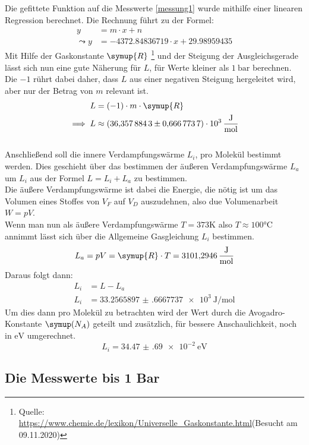 Die gefittete Funktion auf die Messwerte \ref{messung1} wurde mithilfe einer linearen Regression berechnet.
Die Rechnung führt zu der Formel:
\begin{align}
    y&=m\cdot x+n\\
    \leadsto y&=-4372.84836719 \cdot x+29.98959435
\end{align}
Mit Hilfe der Gaskonstante $\symup{R}$   \footnote{Quelle: \url{https://www.chemie.de/lexikon/Universelle_Gaskonstante.html}(Besucht am 09.11.2020)}
und der Steigung der Ausgleichsgerade lässt sich nun eine gute Näherung für $L$, für Werte kleiner als $\SI{1}{\bar}$ berechnen.
Die $-1$ rührt dabei daher, dass $L$ aus einer negativen Steigung hergeleitet wird, aber nur der Betrag von $m$ relevant ist.
\begin{align}
    L&=(-1) \cdot m \cdot \symup{R}\\
    \implies L&\approx\SI{36.3578843(6667737)e3}{\joule\per\mol}
\end{align}\\
Anschließend soll die innere Verdampfungswärme $L_i$, pro Molekül bestimmt werden.
Dies geschieht über das bestimmen der äußeren Verdampfungswärme $L_a$ um $L_i$ aus der Formel $L=L_i+L_a$ zu bestimmen.\\
Die äußere Verdampfungswärme ist dabei die Energie, die nötig ist um das Volumen eines Stoffes von $V_F$ auf $V_D$ auszudehnen,
also due Volumenarbeit $W=pV$.\\
Wenn man nun als äußere Verdampfungswärme $T=373 \si{\kelvin}$ also $T\approx 100 \si{\celsius}$ annimmt lässt sich über die Allgemeine Gasgleichung $L_i$ bestimmen.
\begin{equation}
    L_a=pV=\symup{R} \cdot T = \SI{3101.2946}{\joule\per\mol}
\end{equation}
Daraus folgt dann:
\begin{align}
    L_i&=L-L_a\\
    L_i&=\SI{33.2565897(6667737)e3}{\joule\per\mol}
\end{align}
Um dies dann pro Molekül zu betrachten wird der Wert durch die Avogadro-Konstante $\symup(N_A)$ geteilt und zusätzlich, für bessere Anschaulichkeit,
noch in $\si{\electronvolt}$ umgerechnet.
\begin{equation}
    L_i=\SI{34.47(69)e-2}{\electronvolt}
\end{equation}



\subsection{Die Messwerte bis 1 Bar}

